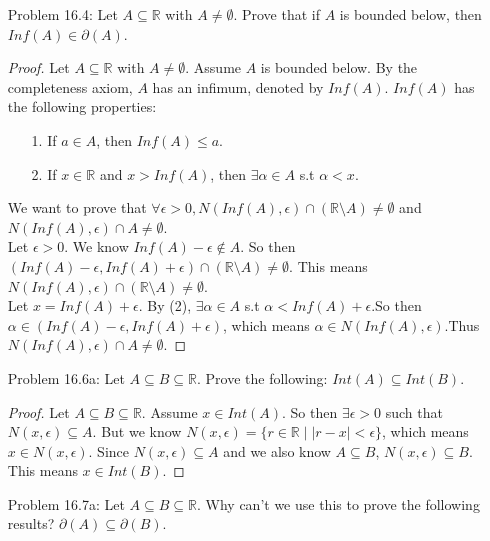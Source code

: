 \documentclass{article}
\theoremstyle{claim}
\theoremstyle{definition}
\begin{document}
\begin{enumerate}
\begin{enumerate}
\begin{proof}
                \end{proof}
            \item $Int(A) \subseteq A'$.
        \end{enumerate}
    \item[Problem 16.4:] Let $A \subseteq \mathbb{R}$ with $A \ne \emptyset$. Prove that if $A$ is bounded below, then $Inf(A) \in \partial(A)$.
        \begin{proof}
            Let $A \subseteq \mathbb{R}$ with $A \ne \emptyset$. Assume $A$ is bounded below. By the completeness axiom, $A$ has an infimum, denoted by $Inf(A)$. $Inf(A)$ has the following properties:
            \begin{enumerate}
                \item[1.] If $a \in A$, then $Inf(A) \le a$.
                \item[2.] If $x \in \mathbb{R}$ and $x > Inf(A)$, then $\exists \alpha \in A$ s.t $ \alpha < x$.
            \end{enumerate}
            We want to prove that $ \forall \epsilon > 0, N(Inf(A), \epsilon) \cap (\mathbb{R} \setminus A) \ne \emptyset$ and $N(Inf(A), \epsilon) \cap A \ne \emptyset$. \\
            Let $\epsilon > 0$. We know $Inf(A) - \epsilon \notin A$. So then $(Inf(A) - \epsilon, Inf(A) + \epsilon) \cap (\mathbb{R} \setminus A) \ne \emptyset$. This means $N(Inf(A), \epsilon) \cap (\mathbb{R} \setminus A) \ne \emptyset$.\\
            Let $x = Inf(A) + \epsilon$. By (2), $\exists \alpha \in A$ s.t $ \alpha < Inf(A) + \epsilon$.So then $\alpha \in (Inf(A) - \epsilon, Inf(A) + \epsilon)$, which means $\alpha \in N(Inf(A), \epsilon)$.Thus $N(Inf(A), \epsilon) \cap A \ne \emptyset$.
        \end{proof}
    \item[Problem 16.6a:] Let $A \subseteq B \subseteq \mathbb{R}$. Prove the following: $Int(A) \subseteq Int(B)$.
        \begin{proof}
            Let $A \subseteq B \subseteq \mathbb{R}$. Assume $x \in Int(A)$. So then $\exists \epsilon > 0$ such that $N(x, \epsilon) \subseteq A$. But we know $N(x, \epsilon) = \{ r \in \mathbb{R} \mid |r - x| < \epsilon\}$, which means $x \in N(x, \epsilon)$. Since $N(x, \epsilon) \subseteq A$ and we also know $A \subseteq B$, $N(x, \epsilon) \subseteq B$. This means $x \in Int(B)$.
        \end{proof}
    \item[Problem 16.7a:] Let $A \subseteq B \subseteq \mathbb{R}$. Why can't we use this to prove the following results? $\partial(A) \subseteq \partial(B)$.

\end{enumerate}
\end{document}
